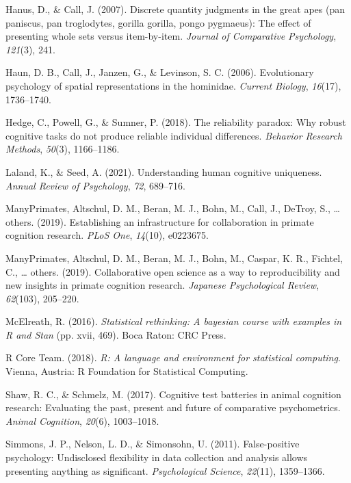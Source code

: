 \documentclass[10pt, letterpaper]{article}
\begin{document}
\leavevmode\hypertarget{ref-hanus2007discrete}{}%
Hanus, D., \& Call, J. (2007). Discrete quantity judgments in the great
apes (pan paniscus, pan troglodytes, gorilla gorilla, pongo pygmaeus):
The effect of presenting whole sets versus item-by-item. \emph{Journal
of Comparative Psychology}, \emph{121}(3), 241.

\leavevmode\hypertarget{ref-haun2006evolutionary}{}%
Haun, D. B., Call, J., Janzen, G., \& Levinson, S. C. (2006).
Evolutionary psychology of spatial representations in the hominidae.
\emph{Current Biology}, \emph{16}(17), 1736--1740.

\leavevmode\hypertarget{ref-hedge2018reliability}{}%
Hedge, C., Powell, G., \& Sumner, P. (2018). The reliability paradox:
Why robust cognitive tasks do not produce reliable individual
differences. \emph{Behavior Research Methods}, \emph{50}(3), 1166--1186.

\leavevmode\hypertarget{ref-laland2021understanding}{}%
Laland, K., \& Seed, A. (2021). Understanding human cognitive
uniqueness. \emph{Annual Review of Psychology}, \emph{72}, 689--716.

\leavevmode\hypertarget{ref-many2019establishing}{}%
ManyPrimates, Altschul, D. M., Beran, M. J., Bohn, M., Call, J., DeTroy,
S., \ldots{} others. (2019). Establishing an infrastructure for
collaboration in primate cognition research. \emph{PLoS One},
\emph{14}(10), e0223675.

\leavevmode\hypertarget{ref-primates2019collaborative}{}%
ManyPrimates, Altschul, D. M., Beran, M. J., Bohn, M., Caspar, K. R.,
Fichtel, C., \ldots{} others. (2019). Collaborative open science as a
way to reproducibility and new insights in primate cognition research.
\emph{Japanese Psychological Review}, \emph{62}(103), 205--220.

\leavevmode\hypertarget{ref-rethinking}{}%
McElreath, R. (2016). \emph{{Statistical rethinking: A bayesian course
with examples in R and Stan}} (pp. xvii, 469). Boca Raton: CRC Press.

\leavevmode\hypertarget{ref-R-base}{}%
R Core Team. (2018). \emph{R: A language and environment for statistical
computing}. Vienna, Austria: R Foundation for Statistical Computing.

\leavevmode\hypertarget{ref-shaw2017cognitive}{}%
Shaw, R. C., \& Schmelz, M. (2017). Cognitive test batteries in animal
cognition research: Evaluating the past, present and future of
comparative psychometrics. \emph{Animal Cognition}, \emph{20}(6),
1003--1018.

\leavevmode\hypertarget{ref-simmons2011false}{}%
Simmons, J. P., Nelson, L. D., \& Simonsohn, U. (2011). False-positive
psychology: Undisclosed flexibility in data collection and analysis
allows presenting anything as significant. \emph{Psychological Science},
\emph{22}(11), 1359--1366.
\end{document}
